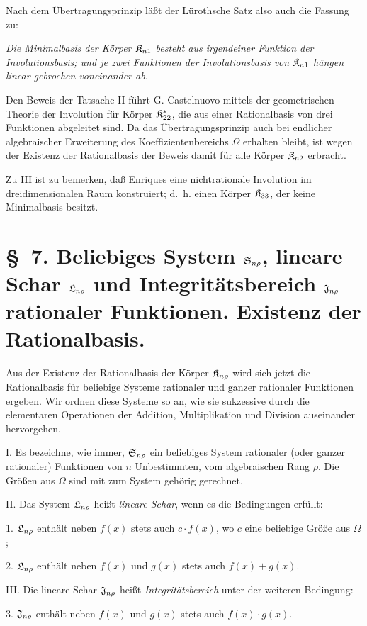 Nach dem Übertragungsprinzip läßt der Lürothsche Satz also auch die Fassung zu:

\emph{Die Minimalbasis der Körper $\mathfrak{K}_{n1}$ besteht aus irgendeiner Funktion der Involutionsbasis; und je zwei Funktionen der Involutionsbasis von $\mathfrak{K}_{n1}$ hängen linear gebrochen voneinander ab.}

Den Beweis der Tatsache II führt G. Castelnuovo mittels der geometrischen Theorie der Involution für Körper $\mathfrak{K}^*_{22}$, die aus einer Rationalbasis von drei Funktionen abgeleitet sind. Da das Übertragungsprinzip auch bei endlicher algebraischer Erweiterung des Koeffizientenbereichs $\Omega$ erhalten bleibt, ist wegen der Existenz der Rationalbasis der Beweis damit für alle Körper $\mathfrak{K}_{n2}$ erbracht.

Zu III ist zu bemerken, daß Enriques eine nichtrationale Involution im dreidimensionalen Raum konstruiert; d.~h. einen Körper $\mathfrak{K}_{33}$, der keine Minimalbasis besitzt.

\section*{\S\ 7. Beliebiges System $\mathfrak{S}_{n\rho}$, lineare Schar $\mathfrak{L}_{n\rho}$ und Integritätsbereich $\mathfrak{J}_{n\rho}$ rationaler Funktionen. Existenz der Rationalbasis.}

Aus der Existenz der Rationalbasis der Körper $\mathfrak{K}_{n\rho}$ wird sich jetzt die Rationalbasis für beliebige Systeme rationaler und ganzer rationaler Funktionen ergeben. Wir ordnen diese Systeme so an, wie sie sukzessive durch die elementaren Operationen der Addition, Multiplikation und Division auseinander hervorgehen.

I. Es bezeichne, wie immer, $\mathfrak{S}_{n\rho}$ ein beliebiges System rationaler (oder ganzer rationaler) Funktionen von $n$ Unbestimmten, vom algebraischen Rang $\rho$. Die Größen aus $\Omega$ sind mit zum System gehörig gerechnet.

II. Das System $\mathfrak{L}_{n\rho}$ heißt \emph{lineare Schar}, wenn es die Bedingungen erfüllt:

1. $\mathfrak{L}_{n\rho}$ enthält neben $f(x)$ stets auch $c\cdot f(x)$, wo $c$ eine beliebige Größe aus $\Omega$;

2. $\mathfrak{L}_{n\rho}$ enthält neben $f(x)$ und $g(x)$ stets auch $f(x)+g(x)$.

III. Die lineare Schar $\mathfrak{J}_{n\rho}$ heißt \emph{Integritätsbereich} unter der weiteren Bedingung:

3. $\mathfrak{J}_{n\rho}$ enthält neben $f(x)$ und $g(x)$ stets auch $f(x)\cdot g(x)$.

